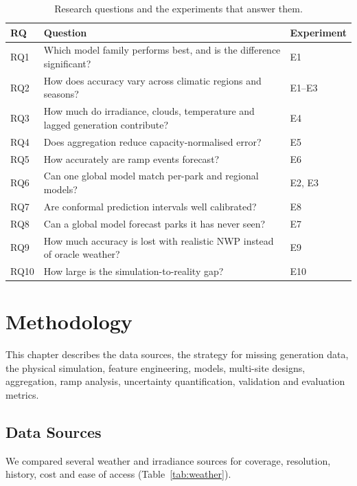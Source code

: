 \documentclass[12pt]{report}
\begin{document}
\begin{table}[htbp]
\centering
\caption{Research questions and the experiments that answer them.}
\label{tab:rq}
\begin{tabularx}{\textwidth}{lLl}
\toprule
RQ & Question & Experiment \\
\midrule
RQ1 & Which model family performs best, and is the difference significant? & E1 \\
RQ2 & How does accuracy vary across climatic regions and seasons? & E1--E3 \\
RQ3 & How much do irradiance, clouds, temperature and lagged generation contribute? & E4 \\
RQ4 & Does aggregation reduce capacity-normalised error? & E5 \\
RQ5 & How accurately are ramp events forecast? & E6 \\
RQ6 & Can one global model match per-park and regional models? & E2, E3 \\
RQ7 & Are conformal prediction intervals well calibrated? & E8 \\
RQ8 & Can a global model forecast parks it has never seen? & E7 \\
RQ9 & How much accuracy is lost with realistic NWP instead of oracle weather? & E9 \\
RQ10 & How large is the simulation-to-reality gap? & E10 \\
\bottomrule
\end{tabularx}
\end{table}

\chapter{Methodology}
This chapter describes the data sources, the strategy for missing generation data, the physical simulation, feature engineering, models, multi-site designs, aggregation, ramp analysis, uncertainty quantification, validation and evaluation metrics. 


\section{Data Sources}
\vspace{1mm}
We compared several weather and irradiance sources for coverage, resolution, history, cost and ease of access (Table~\ref{tab:weather}).
\end{document}
